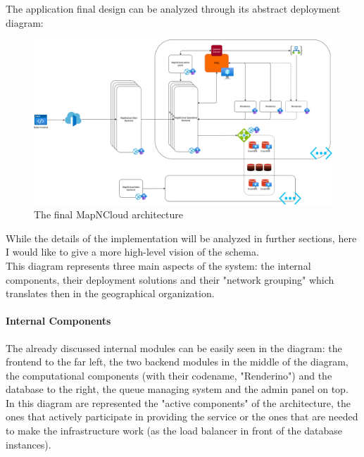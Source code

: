 The application final design can be analyzed through its abstract deployment diagram:
\begin{figure}[H]
  \centering
  \includegraphics[width = \textwidth]{../Images/SystemDesign-Final.drawio.png}
  \caption{The final MapNCloud architecture}
\end{figure}
While the details of the implementation will be analyzed in further sections, here I would like to give a more high-level vision of the schema.\\
This diagram represents three main aspects of the system: the internal components, their deployment solutions and their "network grouping" which translates then in the geographical organization.

\paragraph{Internal Components}
  The already discussed internal modules can be easily seen in the diagram: the frontend to the far left, the two backend modules in the middle of the diagram, the computational components (with their codename, "Renderino") and the database to the right, the queue managing system and the admin panel on top. In this diagram are represented the "active components" of the architecture, the ones that actively participate in providing the service or the ones that are needed to make the infrastructure work (as the load balancer in front of the database instances).

